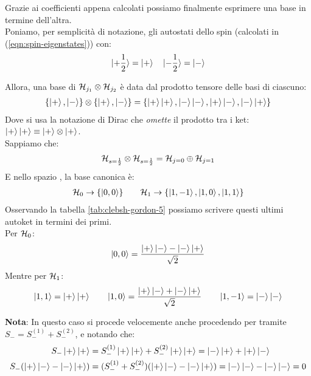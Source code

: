 \documentclass[../../FisicaTeorica.tex]{subfiles}
\begin{document}
Grazie ai coefficienti appena calcolati possiamo finalmente esprimere una base in termine dell'altra.\\
Poniamo, per semplicità di notazione, gli autostati dello spin (calcolati in (\ref{eqn:spin-eigenstates})) con:
\begin{align*}
\ket{+\frac{1}{2}} = \ket{+} \quad \ket{-\frac{1}{2}} =\ket{-}
\end{align*}

Allora, una base di $\mathcal{H}_{j_1}\otimes \mathcal{H}_{j_2}$ è data dal prodotto tensore delle basi di ciascuno:
\begin{align*}
\{\ket{+},\ket{-}\}\otimes \{\ket{+},\ket{-}\} = \{\ket{+}\ket{+},\ket{-}\ket{-}, \ket{+}\ket{-}, \ket{-}\ket{+}\}
\end{align*}
Dove si usa la notazione di Dirac che \textit{omette} il prodotto tra i ket: $\ket{+}\ket{+} \equiv \ket{+}\otimes \ket{+}$.\\

Sappiamo che:
\begin{align*}
\mathcal{H}_{s=\frac{1}{2}}\otimes \mathcal{H}_{s=\frac{1}{2}} = \mathcal{H}_{j=0} \oplus \mathcal{H}_{j=1}
\end{align*}
E nello spazio , la base canonica è:
\begin{align*}
\mathcal{H}_0 \to \{\ket{0,0}\} \qquad \mathcal{H}_1 \to \{\ket{1,-1},\ket{1,0},\ket{1,1}\}
\end{align*}
Osservando la tabella \ref{tab:clebsh-gordon-5} possiamo scrivere questi ultimi autoket in termini dei primi.\\
Per $\mathcal{H}_0$:
\begin{align*}
\ket{0,0}=
\frac{\ket{+}\ket{-}-\ket{-}\ket{+}}{\sqrt{2}}
\end{align*}
Mentre per $\mathcal{H}_1$:
\begin{align*}
\ket{1,1} = \ket{+}\ket{+} \qquad \ket{1,0} = \frac{\ket{+}\ket{-}+\ket{-}\ket{+}}{\sqrt{2}} \qquad \ket{1,-1} = \ket{-}\ket{-}
\end{align*}

\textbf{Nota}: In questo caso si procede velocemente anche procedendo per  tramite $S_- = S^{(1)}_- + S^{(2)}_-$, e notando che:
\begin{align*}
S_- \ket{+}\ket{+} &= S^{(1)}_{-}\ket{+}\ket{+} + S^{(2)}_{-}\ket{+}\ket{+} = \ket{-}\ket{+}+\ket{+}\ket{-}\\
S_- (\ket{+}\ket{-}-\ket{-}\ket{+})&=(S^{(1)}_- + S^{(2)}_-)(\ket{+}\ket{-}-\ket{-}\ket{+})=\ket{-}\ket{-}-\ket{-}\ket{-}=0
\end{align*}
\end{document}
